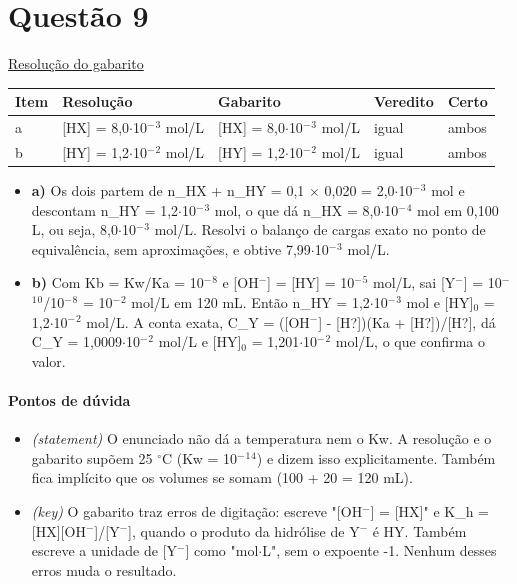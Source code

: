 \documentclass{article}%
\begin{document}
\section*{Questão 9}%
\href{https://poliedroresolve.sistemapoliedro.com.br/vestibulares/ita/2027/ita-2-fase-dia-2-21-10-2026-2-fase-dia-2/dissertativa-9-quimica-2-fase-dia-2-ita-2027}{Resolução do gabarito}\par\smallskip%
\begin{longtable}{@{}p{} p{} p{} p{} p{}@{}}\toprule Item & Resolução & Gabarito & Veredito & Certo \\ \midrule
a & {[}HX{]} = 8,0$\cdot$10$^{-}$$^3$ mol/L & {[}HX{]} = 8,0$\cdot$10$^{-}$$^3$ mol/L & igual & ambos \\
b & {[}HY{]} = 1,2$\cdot$10$^{-}$$^2$ mol/L & {[}HY{]} = 1,2$\cdot$10$^{-}$$^2$ mol/L & igual & ambos \\
\bottomrule\end{longtable}%
\begin{itemize}%
\item%
\textbf{a)} Os dois partem de n\_HX + n\_HY = 0,1 $\times$ 0,020 = 2,0$\cdot$10$^{-}$$^3$ mol e descontam n\_HY = 1,2$\cdot$10$^{-}$$^3$ mol, o que dá n\_HX = 8,0$\cdot$10$^{-}$$^{4}$ mol em 0,100 L, ou seja, 8,0$\cdot$10$^{-}$$^3$ mol/L. Resolvi o balanço de cargas exato no ponto de equivalência, sem aproximações, e obtive 7,99$\cdot$10$^{-}$$^3$ mol/L.%
\item%
\textbf{b)} Com Kb = Kw/Ka = 10$^{-}$$^{8}$ e {[}OH$^{-}${]} = {[}HY{]} = 10$^{-}$$^{5}$ mol/L, sai {[}Y$^{-}${]} = 10$^{-}$$^{1}$$^{0}$/10$^{-}$$^{8}$ = 10$^{-}$$^2$ mol/L em 120 mL. Então n\_HY = 1,2$\cdot$10$^{-}$$^3$ mol e {[}HY{]}$_{0}$ = 1,2$\cdot$10$^{-}$$^2$ mol/L. A conta exata, C\_Y = ({[}OH$^{-}${]} - {[}H?{]})(Ka + {[}H?{]})/{[}H?{]}, dá C\_Y = 1,0009$\cdot$10$^{-}$$^2$ mol/L e {[}HY{]}$_{0}$ = 1,201$\cdot$10$^{-}$$^2$ mol/L, o que confirma o valor.%
\end{itemize}%
\paragraph{Pontos de dúvida}%
\begin{itemize}%
\item%
\textit{(statement)} O enunciado não dá a temperatura nem o Kw. A resolução e o gabarito supõem 25 $^\circ$C (Kw = 10$^{-}$$^{1}$$^{4}$) e dizem isso explicitamente. Também fica implícito que os volumes se somam (100 + 20 = 120 mL).%
\item%
\textit{(key)} O gabarito traz erros de digitação: escreve "{[}OH$^{-}${]} = {[}HX{]}" e K\_h = {[}HX{]}{[}OH$^{-}${]}/{[}Y$^{-}${]}, quando o produto da hidrólise de Y$^{-}$ é HY. Também escreve a unidade de {[}Y$^{-}${]} como "mol$\cdot$L", sem o expoente -1. Nenhum desses erros muda o resultado.%
\end{itemize}%
\end{document}
